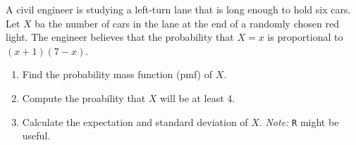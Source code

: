 
\begin{exercise}

A civil engineer is studying a left-turn lane that is long enough to hold six cars.
Let $X$ ba the number of cars in the lane at the end of a randomly chosen red light.
The engineer believes that the probability that $X = x$ is proportional to $(x + 1) (7 - x)$.

\begin{enumerate}[label = (\alph*)]

    \item Find the probability mass function (pmf) of $X$.

    \item Compute the proability that $X$ will be at least $4$.

    \item Calculate the expectation and standard deviation of $X$.
    \textit{Note:}
    \texttt R might be useful.

\end{enumerate}

\end{exercise}


